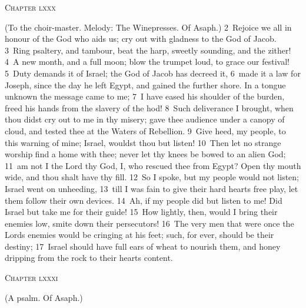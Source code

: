 \documentclass[10pt]{book} %
\begin{document}
\begin{large}\begin{center}\textsc{Chapter lxxx}\end{center}\end{large}
(To the choir-master. Melody: The Winepresses. Of Asaph.)
\textcolor{benred8}{2}~Rejoice we all in honour of the God who aids us; cry out with gladness to the God of Jacob. \textcolor{benred8}{3}~Ring psaltery, and tambour, beat the harp, sweetly sounding, and the zither! \textcolor{benred8}{4}~A new month, and a full moon; blow the trumpet loud, to grace our festival! \textcolor{benred8}{5}~Duty demands it of Israel; the God of Jacob has decreed it, \textcolor{benred8}{6}~made it a law for Joseph, since the day he left Egypt, and gained the further shore. In a tongue unknown the message came to me; \textcolor{benred8}{7}~I have eased his shoulder of the burden, freed his hands from the slavery of the hod! \textcolor{benred8}{8}~Such deliverance I brought, when thou didst cry out to me in thy misery; gave thee audience under a canopy of cloud, and tested thee at the Waters of Rebellion.
\textcolor{benred8}{9}~Give heed, my people, to this warning of mine; Israel, wouldst thou but listen! \textcolor{benred8}{10}~Then let no strange worship find a home with thee; never let thy knees be bowed to an alien God; \textcolor{benred8}{11}~am not I the Lord thy God, I, who rescued thee from Egypt? Open thy mouth wide, and thou shalt have thy fill. \textcolor{benred8}{12}~So I spoke, but my people would not listen; Israel went on unheeding, \textcolor{benred8}{13}~till I was fain to give their hard hearts free play, let them follow their own devices. \textcolor{benred8}{14}~Ah, if my people did but listen to me! Did Israel but take me for their guide! \textcolor{benred8}{15}~How lightly, then, would I bring their enemies low, smite down their persecutors! \textcolor{benred8}{16}~The very men that were once the Lord\textquotesingle s enemies would be cringing at his feet; such, for ever, should be their destiny; \textcolor{benred8}{17}~Israel should have full ears of wheat to nourish them, and honey dripping from the rock to their heart\textquotesingle s content.
\begin{large}\begin{center}\textsc{Chapter lxxxi}\end{center}\end{large}
(A psalm. Of Asaph.)
\end{document}
